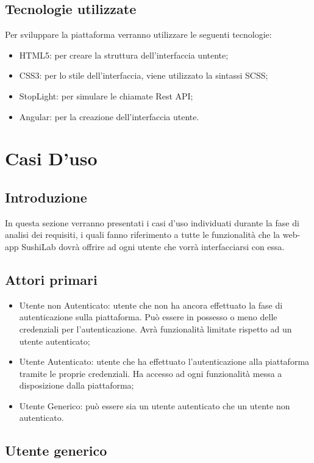 \subsection{Tecnologie utilizzate}
Per sviluppare la piattaforma verranno utilizzare le seguenti tecnologie:
\begin{itemize}
    \item HTML5\gl{}: per creare la struttura dell'interfaccia untente;
    \item CSS3\gl{}: per lo stile dell'interfaccia, viene utilizzato la sintassi SCSS;
    \item StopLight\gl{}: per simulare le chiamate Rest API;
    \item Angular\gl{}: per la creazione dell'interfaccia utente.
\end{itemize}

\section{Casi D'uso}
\subsection{Introduzione }
In questa sezione verranno presentati i casi d'uso individuati durante la fase di analisi dei requisiti, i quali fanno riferimento a tutte le funzionalità che la web-app SushiLab dovrà offrire ad ogni utente che vorrà interfacciarsi con essa.
\subsection{Attori primari}
\begin{itemize}
    \item Utente non Autenticato: utente che non ha ancora effettuato la fase di autenticazione sulla piattaforma. Può essere in possesso o meno delle credenziali per l'autenticazione. Avrà funzionalità limitate rispetto ad un utente autenticato;
    \item Utente Autenticato: utente che ha effettuato l'autenticazione alla piattaforma tramite le proprie credenziali. Ha accesso ad ogni funzionalità messa a disposizione dalla piattaforma;
    \item  Utente Generico: può essere sia un utente autenticato che un utente non autenticato.
\end{itemize}
\subsection{Utente generico}
